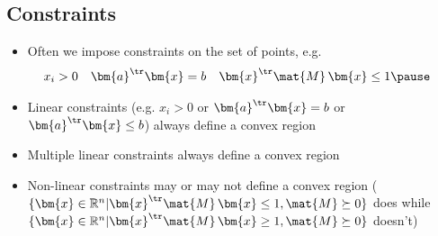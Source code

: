 
\begin{slide}
\section{Constraints}

\begin{PauseHighLight}
  \begin{itemize}
  \item Often we impose constraints on the set of points, e.g.
    \begin{align*}
      x_i &> 0  & \bm{a}^\tr \bm{x} &= b & \bm{x}^\tr \mat{M}
                                           \, \bm{x} &\leq 1\pause
    \end{align*}
  \item Linear constraints (e.g. $x_i > 0$ or $\bm{a}^\tr \bm{x} =
    b$ or $\bm{a}^\tr \bm{x} \leq b$) always define a
    convex region\pause
  \item Multiple linear constraints always define a convex region\pause
  \item Non-linear constraints may or may not define a convex
    region\pause{} ($\{\bm{x} \in \mathbb{R}^n|\bm{x}^\tr \mat{M}\, \bm{x}
    \leq 1, \mat{M}\succeq 0\}$ does while
     $\{\bm{x} \in \mathbb{R}^n|\bm{x}^\tr \mat{M}\, \bm{x}
    \geq 1, \mat{M}\succeq 0\}$ doesn't)\pauseb
  \end{itemize}
\end{PauseHighLight}
  

\end{slide}




